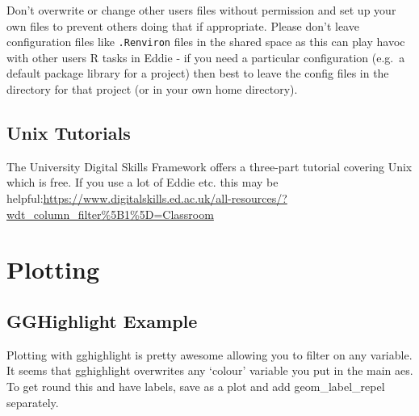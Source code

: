 \documentclass[]{book}
\theoremstyle{definition}
\theoremstyle{definition}
\theoremstyle{definition}
\theoremstyle{remark}
\begin{document}
Don't overwrite or change other users files without permission and set
up your own files to prevent others doing that if appropriate. Please
don't leave configuration files like \texttt{.Renviron} files in the
shared space as this can play havoc with other users R tasks in Eddie -
if you need a particular configuration (e.g.~a default package library
for a project) then best to leave the config files in the directory for
that project (or in your own home directory).

\hypertarget{unix-tutorials}{%
\section{Unix Tutorials}\label{unix-tutorials}}

The University Digital Skills Framework offers a three-part tutorial
covering Unix which is free. If you use a lot of Eddie etc. this may be
helpful:\url{https://www.digitalskills.ed.ac.uk/all-resources/?wdt_column_filter\%5B1\%5D=Classroom}

\hypertarget{plotting}{%
\chapter{Plotting}\label{plotting}}

\hypertarget{gghighlight-example}{%
\section{GGHighlight Example}\label{gghighlight-example}}

Plotting with gghighlight is pretty awesome allowing you to filter on
any variable. It seems that gghighlight overwrites any `colour' variable
you put in the main aes. To get round this and have labels, save as a
plot and add geom\_label\_repel separately.
\end{document}
